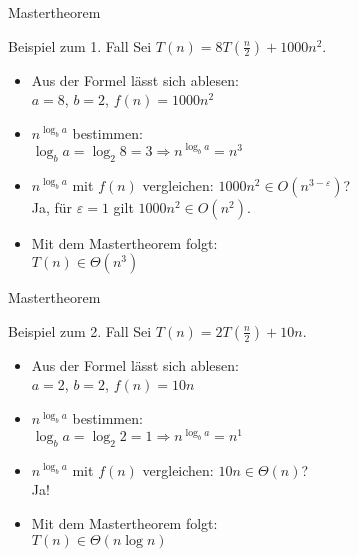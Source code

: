 \begin{frame}{Mastertheorem}
    \begin{exampleblock}{Beispiel zum 1. Fall}
    	Sei $T(n) = 8 T \left(\frac{n}{2} \right) + 1000n^2$.
    	\begin{itemize}
    		\item Aus der Formel lässt sich ablesen:\\
    			$a=8$, $b=2$, $f(n)=1000n^2$
    		\item $n^{\log_b a}$ bestimmen:\\
    			$\log_b a = \log_2 8 = 3 \Rightarrow n^{\log_b a} = n^3$
    		\item $n^{\log_b a}$ mit $f(n)$ vergleichen: $1000n^2 \in O(n^{3-\varepsilon})$?\\
    			Ja, für $\varepsilon = 1$ gilt $1000n^2 \in O(n^2)$.
    		\item Mit dem Mastertheorem folgt:\\
    			$T(n) \in \Theta(n^3)$
    	\end{itemize}
    \end{exampleblock}
\end{frame}


\begin{frame}{Mastertheorem}
    \begin{exampleblock}{Beispiel zum 2. Fall}
    	Sei $T(n) = 2 T \left(\frac{n}{2} \right) + 10n$.
    	\begin{itemize}
    		\item Aus der Formel lässt sich ablesen:\\
    			$a=2$, $b=2$, $f(n)=10n$
    		\item $n^{\log_b a}$ bestimmen:\\
    			$\log_b a = \log_2 2 = 1 \Rightarrow n^{\log_b a} = n^1$
    		\item $n^{\log_b a}$ mit $f(n)$ vergleichen: $10n \in \Theta(n)$?\\
    			Ja!
    		\item Mit dem Mastertheorem folgt:\\
    			$T(n) \in \Theta(n \log n)$
    	\end{itemize}
    \end{exampleblock}
\end{frame}



